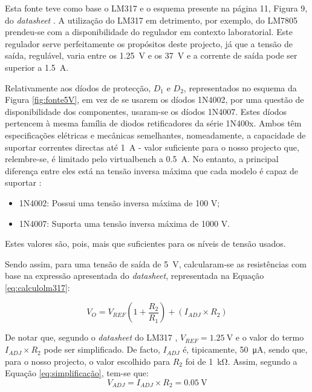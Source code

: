 Esta fonte teve como base o LM317 e o esquema presente na página 11, Figura 9, do \textit{datasheet} \cite{LM317}. A utilização do LM317 em detrimento, por exemplo, do LM7805 prendeu-se com a disponibilidade do regulador em contexto laboratorial. Este regulador serve perfeitamente os propósitos deste projecto, já que a tensão de saída, regulável, varia entre os \SI{1.25}{\volt} e os \SI{37}{\volt} e a corrente de saída pode ser superior a \SI{1.5}{\ampere}.

Relativamente aos díodos de protecção, $D_{1}$ e $D_{2}$, representados no esquema da Figura \ref{fig:fonte5V}, em vez de se usarem os díodos 1N4002, por uma questão de disponibilidade dos componentes, usaram-se os díodos 1N4007. Estes díodos pertencem à mesma família de diodos retificadores da série 1N400x. Ambos têm especificações elétricas e mecânicas semelhantes, nomeadamente, a capacidade de suportar correntes directas até \SI{1}{\ampere} - valor suficiente para o nosso projecto que, relembre-se, é limitado pelo \acrshort{virtualbench} a \SI{0.5}{\ampere}. No entanto, a principal diferença entre eles está na tensão inversa máxima que cada modelo é capaz de suportar \cite{1N400x}:

\begin{itemize}
	\item 1N4002: Possui uma tensão inversa máxima de 100 V;
	\item 1N4007: Suporta uma tensão inversa máxima de 1000 V.
\end{itemize}

Estes valores são, pois, mais que suficientes para os níveis de tensão usados.

Sendo assim, para uma tensão de saída de \SI{5}{\volt}, calcularam-se as resistências com base na expressão apresentada do \textit{datasheet}, representada na Equação \ref{eq:calculolm317}: 

\begin{equation} \label{eq:calculolm317}
	V_{O} = V_{REF} (1 + \frac{R_{2}}{R_{1}}) + (I_{ADJ} \times R_{2})
\end{equation}

De notar que, segundo o \textit{datasheet} do LM317 \cite{LM317}, $V_{REF} = \SI{1.25}{\volt}$ e o valor do termo $I_{ADJ} \times R_{2}$ pode ser simplificado. De facto, $I_{ADJ}$ é, tipicamente, \SI{50}{\micro\ampere}, sendo que, para o nosso projecto, o valor escolhido para $R_{2}$ foi de \SI{1}{\kilo\ohm}. Assim, segundo a Equação \ref{eq:simplificação}, tem-se que:
\begin{equation} \label{eq:simplificação}
	V_{ADJ} = I_{ADJ} \times R_{2} = \SI{0.05}{\volt}
\end{equation}

